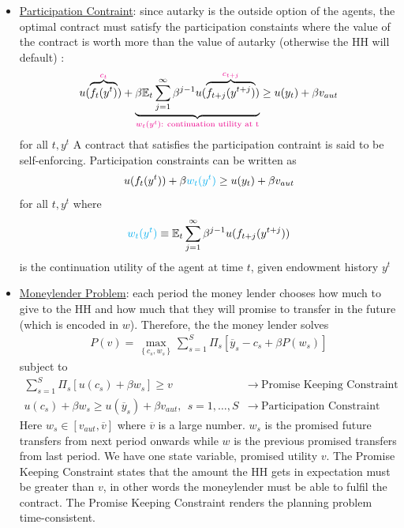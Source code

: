 \documentclass{article}
\begin{document}
\begin{itemize}
\begin{itemize}
        \item \underline{Participation Contraint}: since autarky is the outside option of the agents, the optimal contract must satisfy the participation constaints where the value of the contract is worth more than the value of autarky (otherwise the HH will default) :
        \begin{gather*}
            u(\overbrace{f_{t}(y^{t})}^{\begingroup\color{magenta} c_{t} \endgroup}) + \underbrace{\beta \mathbb{E}_{t} \sum_{j=1}^{\infty} \beta^{j-1} u(\overbrace{f_{t+j}(y^{t+j})}^{\begingroup\color{magenta} c_{t+j} \endgroup})}_{\begingroup\color{magenta} w_{t}(y^{t}): \ \text{continuation utility at t} \endgroup} \geq u(y_{t}) + \beta v_{aut}
        \end{gather*}
        for all $t, y^{t}$
        A contract that satisfies the participation contraint is said to be self-enforcing. Participation constraints can be written as
        \begin{gather*}
            u(f_{t}(y^{t})) + \beta \begingroup\color{cyan} w_{t}(y^{t}) \endgroup \geq u(y_{t}) + \beta v_{aut}
        \end{gather*}
        for all $t, y^{t}$ where
        \begin{gather*}
            \begingroup\color{cyan} w_{t}(y^{t}) \endgroup \equiv \mathbb{E}_{t} \sum_{j=1}^{\infty} \beta^{j-1} u(f_{t+j} (y^{t+j}))
        \end{gather*}
        is the continuation utility of the agent at time $t$, given endowment history $y^{t}$
        \item  \underline{Moneylender Problem}: each period the money lender chooses how much to give to the HH and how much that they will promise to transfer in the future (which is encoded in $w$). Therefore, the the money lender solves
        \begin{gather*}
            P(v) = \max_{\left\{ c_{s}, w_{s} \right\} } \sum_{s=1}^{S} \Pi_{s} [\overline{y}_{s} - c_{s} + \beta P(w_{s})]
        \end{gather*}
        subject to
        \begin{align*}
            \sum_{s=1}^{S} \Pi_{s} [u(c_{s}) + \beta w_{s}] \geq v & \rightarrow \ \text{Promise Keeping Constraint} \\
            u(c_{s}) + \beta w_{s} \geq u(\overline{y}_{s}) + \beta v_{aut}, \ \ s = 1, \dots, S & \rightarrow \ \text{Participation Constraint}
        \end{align*}
        Here $w_{s} \in [v_{aut}, \overline{v}]$ where $\overline{v}$ is a large number. $w_{s}$ is the promised future transfers from next period onwards while $w$ is the previous promised transfers from last period. We have one state variable, promised utility $v$. The Promise Keeping Constraint states that the amount the HH gets in expectation must be greater than $v$, in other words the moneylender must be able to fulfil the contract. The Promise Keeping Constraint renders the planning problem time-consistent.

\end{itemize}
\end{itemize}
\end{document}
